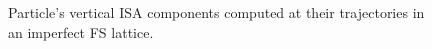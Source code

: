 \begin{figure}[!h]
	\centering
	\hfill
	\hfill
	\caption{Particle's vertical ISA components computed at their trajectories
          in an imperfect FS lattice.\label{decoh:fig:NY_on_traj}}
\end{figure}

